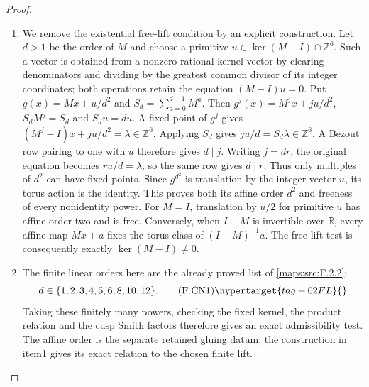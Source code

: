\begin{proof}
\begin{enumerate}[label={$\langle1\rangle$\arabic*.}]
\item We remove the existential free-lift condition by an explicit
construction. Let $d>1$ be the order of $M$ and choose a primitive
$u\in\ker(M-I)\cap\mathbb Z^6$. Such a vector is obtained from a
nonzero rational kernel vector by clearing denominators and dividing
by the greatest common divisor of its integer coordinates; both
operations retain the equation $(M-I)u=0$. Put
$g(x)=Mx+u/d^2$ and $S_d=\sum_{a=0}^{d-1}M^a$.
Then $g^j(x)=M^jx+ju/d^2$, $S_dM^j=S_d$ and $S_du=du$.
A fixed point of $g^j$ gives
$(M^j-I)x+ju/d^2=\lambda\in\mathbb Z^6$.
Applying $S_d$ gives $ju/d=S_d\lambda\in\mathbb Z^6$.
A Bezout row pairing to one with $u$ therefore gives $d\mid j$.
Writing $j=dr$, the original equation becomes $ru/d=\lambda$,
so the same row gives $d\mid r$. Thus only multiples of $d^2$
can have fixed points. Since $g^{d^2}$ is translation by the
integer vector $u$, its torus action is the identity. This proves
both its affine order $d^2$ and freeness of every nonidentity power.
For $M=I$, translation by $u/2$ for primitive $u$ has affine order
two and is free. Conversely, when $I-M$ is invertible over
$\mathbb R$, every affine map $Mx+a$ fixes the torus class of
$(I-M)^{-1}a$. The free-lift test is consequently exactly
$\ker(M-I)\ne0$.

\item The finite linear orders here are the already proved list of
\cref{maps:src:F.2.2}:
\[
 d\in\{1,2,3,4,5,6,8,10,12\}.
 \tag{F.CN1}\hypertarget{tag-02FL}{}\label{maps:eq:F.CN1}
\]
Taking these finitely many powers, checking the fixed kernel,
the product relation and the cusp Smith factors therefore gives
an exact admissibility test. The affine order is the
separate retained gluing datum; the construction in item1 gives
its exact relation to the chosen finite lift.


\end{enumerate}
\end{proof}
